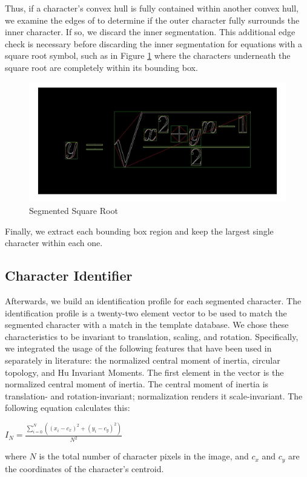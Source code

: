 \documentclass[journal]{IEEEtran}
\begin{document}
Thus, if a character’s convex hull is fully contained within another convex hull, we examine the edges of to determine if the outer character fully surrounds the inner character. If so, we discard the inner segmentation. This additional edge check is necessary before discarding the inner segmentation for equations with a square root symbol, such as in Figure \ref{fig:seg_eq} where the characters underneath the square root are completely within its bounding box. 

\begin{figure}[!t]
    \centering
    \includegraphics[width=\columnwidth]{seg_eq}
    \caption{Segmented Square Root}
    \label{fig:seg_eq}
\end{figure}
Finally, we extract each bounding box region and keep the largest single character within each one.

\subsection{Character Identifier}
Afterwards, we build an identification profile for each segmented character. The identification profile is a twenty-two element vector to be used to match the segmented character with a match in the template database.
We chose these characteristics to be invariant to translation, scaling, and rotation. Specifically, we integrated the usage of the following features that have been used in separately in literature:  the normalized central moment of inertia, circular topology\cite{Torres-Mendez:article_typical}, and Hu Invariant Moments\cite{Potocnik:article_typical}.
The first element in the vector is the normalized central moment of inertia\cite{Torres-Mendez:article_typical}. The central moment of inertia is translation- and rotation-invariant; normalization renders it scale-invariant. The following equation calculates this:
\begin{center}
    
\(
I_N = \frac{\sum\limits_{i=0}^N((x_i-c_x)^2 + (y_i - c_y)^2)}{N^2}
\)
\end{center}
where $N$ is the total number of character pixels in the image, and $c_x$ and $c_y$ are the coordinates of the character’s centroid.
\end{document}
